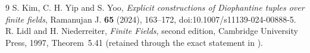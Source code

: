 \documentclass[11pt,a4paper]{article}
\begin{document}
\begin{thebibliography}{9}
 S. Kim, C. H. Yip and S. Yoo,
\emph{Explicit constructions of Diophantine tuples over finite fields},
Ramanujan J. \textbf{65} (2024), 163--172,
doi:10.1007/s11139-024-00888-5.
 R. Lidl and H. Niederreiter, \emph{Finite Fields}, second
edition, Cambridge University Press, 1997, Theorem~5.41 (retained through
the exact statement in \cite[Lemma 2.1]{KYY}).
\end{thebibliography}
\end{document}
